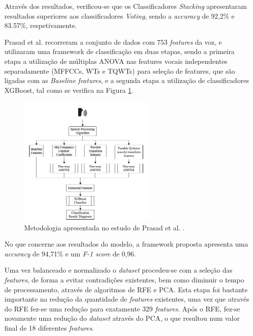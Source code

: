 \documentclass[12pt,a4paper,twoside]{report}
\begin{document}
{Através dos resultados, verificou-se que os Classificadores \textit{Stacking} apresentaram resultados superiores aos classificadores \textit{Voting}, sendo a \textit{accuracy} de 92,2\% e 83.57\%, respetivamente.

Prasad et al. \cite{Prasad2020}  recorreram a conjunto de dados com 753 \textit{features} da voz, e utilizaram uma framework de classificação em duas etapas, sendo a primeira etapa a utilização de múltiplas \gls{ANOVA} nas features vocais independentes separadamente (MFFCCs, WTs e TQWTs) para seleção de features, que são ligadas com as \textit{Baseline features}, e a segunda etapa a utilização de classificadores \gls{XGBoost}, tal como se verifica na Figura \ref{fig:prasad}. 

\begin{figure}[H]
    \centering
    \includegraphics[width=0.6\textwidth]{imagens/prasad.png}
    \caption{Metodologia apresentada no estudo de Prasad et al. \cite{Prasad2020}.}
    \label{fig:prasad}
\end{figure}

No que concerne aos resultados do modelo, a framework proposta apresenta uma \textit{accuracy} de 94,71\% e um \textit{F-1 score} de 0,96.


Uma vez balanceado e normalizado o \textit{dataset} procedeu-se com a seleção das \textit{features}, de forma a evitar contradições existentes, bem como diminuir o tempo de processamento, através de algoritmos de \gls{RFE} e \gls{PCA}. Esta etapa foi bastante importante na redução da quantidade de \textit{features} existentes, uma vez que através do \gls{RFE} fez-se uma redução para exatamente 329 \textit{features}. Após o \gls{RFE}, fez-se novamente uma redução do \textit{dataset} através do \gls{PCA}, o que resultou num valor final de 18 diferentes \textit{features}.

}
\end{document}
